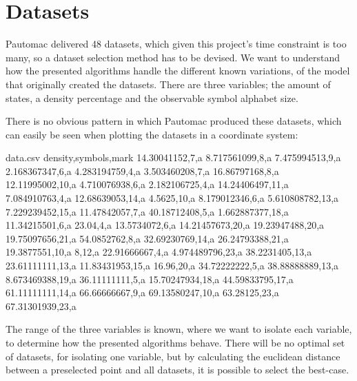 \section{Datasets}
Pautomac delivered 48 datasets, which given this project's time constraint is too many, so a dataset selection method has to be devised. We want to understand how the presented algorithms handle the different known variations, of the model that originally created the datasets. There are three variables; the amount of states, a density percentage and the observable symbol alphabet size.

There is no obvious pattern in which Pautomac produced these datasets, which can easily be seen when plotting the datasets in a coordinate system:

\begin{filecontents*}{data.csv}
density,symbols,mark
14.30041152,7,a
8.717561099,8,a
7.475994513,9,a
2.168367347,6,a
4.283194759,4,a
3.503460208,7,a
16.86797168,8,a
12.11995002,10,a
4.710076938,6,a
2.182106725,4,a
14.24406497,11,a
7.084910763,4,a
12.68639053,14,a
4.5625,10,a
8.179012346,6,a
5.610808782,13,a
7.229239452,15,a
11.47842057,7,a
40.18712408,5,a
1.662887377,18,a
11.34215501,6,a
23.04,4,a
13.5734072,6,a
14.21457673,20,a
19.23947488,20,a
19.75097656,21,a
54.0852762,8,a
32.69230769,14,a
26.24793388,21,a
19.3877551,10,a
8,12,a
22.91666667,4,a
4.974489796,23,a
38.2231405,13,a
23.61111111,13,a
11.83431953,15,a
16.96,20,a
34.72222222,5,a
38.88888889,13,a
8.673469388,19,a
36.11111111,5,a
15.70247934,18,a
44.59833795,17,a
61.11111111,14,a
66.66666667,9,a
69.13580247,10,a
63.28125,23,a
67.31301939,23,a
\end{filecontents*}


The range of the three variables is known, where we want to isolate each variable, to determine how the presented algorithms behave. There will be no optimal set of datasets, for isolating one variable, but by calculating the euclidean distance between a preselected point and all datasets, it is possible to select the best-case.

